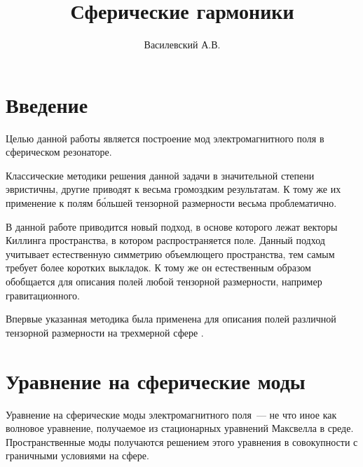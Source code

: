 \documentclass[12pt,a4paper]{article}
\title{Сферические гармоники}
\author{Василевский А.В.}
\begin{document}
    \maketitle
    \tableofcontents


    \section*{Введение}

        Целью данной работы является построение мод электромагнитного поля в сферическом резонаторе.

        Классические методики решения данной задачи в значительной степени эвристичны, другие приводят к весьма громоздким результатам. К тому же их применение к полям б\'{о}льшей тензорной размерности весьма проблематично.

        В данной работе приводится новый подход, в основе которого лежат векторы Киллинга пространства, в котором распространяется поле. Данный подход учитывает естественную симметрию объемлющего пространства, тем самым требует более коротких выкладок. К тому же он естественным образом обобщается для описания полей любой тензорной размерности, например гравитационного.

        Впервые указанная методика была применена для описания полей различной тензорной размерности на трехмерной сфере \cite{burlankov_tmf}.


    \section{Уравнение на сферические моды}

        Уравнение на сферические моды электромагнитного поля~--- не что иное как волновое уравнение, получаемое из стационарных уравнений Максвелла в среде. Пространственные моды получаются решением этого уравнения в совокупности с граничными условиями на сфере.
\end{document}
